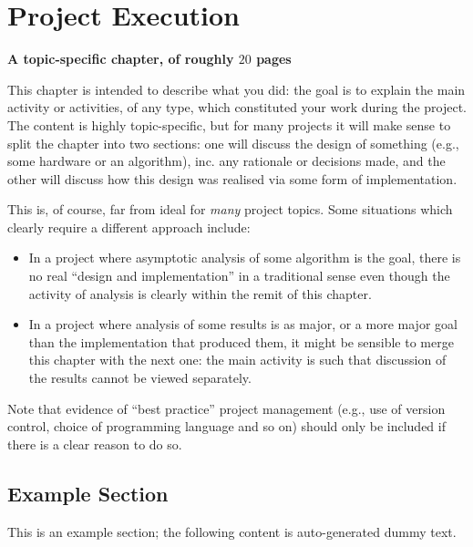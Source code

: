 \documentclass[ %
                    author={Luke Murray},
                supervisor={Dr. Simon Hollis},
                     title={Shadow Peer-to-Peer Networks},
                  subtitle={},
                    degree={MEng},
                      year={2013} ]{thesis}
\begin{document}

\chapter{Project Execution}
\label{chap:execution}

{\bf A topic-specific chapter, of roughly $20$ pages} 
\vspace{1cm} 

\noindent
This chapter is intended to describe what you did: the goal is to explain
the main activity or activities, of any type, which constituted your work 
during the project.  The content is highly topic-specific, but for many 
projects it will make sense to split the chapter into two sections: one 
will discuss the design of something (e.g., some hardware or an algorithm), 
inc. any rationale or decisions made, and the other will discuss how this 
design was realised via some form of implementation.  

This is, of course, far from ideal for {\em many} project topics.  Some
situations which clearly require a different approach include:

\begin{itemize}
\item In a project where asymptotic analysis of some algorithm is the goal,
      there is no real ``design and implementation'' in a traditional sense
      even though the activity of analysis is clearly within the remit of
      this chapter.
\item In a project where analysis of some results is as major, or a more
      major goal than the implementation that produced them, it might be
      sensible to merge this chapter with the next one: the main activity 
      is such that discussion of the results cannot be viewed separately.
\end{itemize}

\noindent
Note that evidence of ``best practice'' project management (e.g., use of 
version control, choice of programming language and  so on) should only 
be included if there is a clear reason to do so.

\section{Example Section}

This is an example section; 
the following content is auto-generated dummy text.
\lipsum
\end{document}
